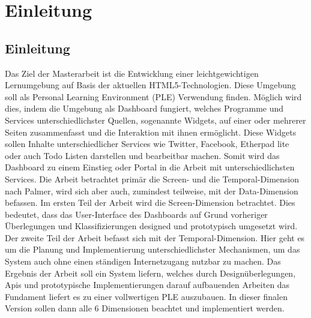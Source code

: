 \chapter{Einleitung} 
\label{Kapitel 1}
\section{Einleitung}
Das Ziel der Masterarbeit ist die Entwicklung einer leichtgewichtigen Lernumgebung auf Basis der aktuellen HTML5-Technologien. Diese Umgebung soll als Personal Learning Environment (PLE) Verwendung finden. Möglich wird dies, indem die Umgebung als Dashboard fungiert, welches Programme und Services unterschiedlichster Quellen, sogenannte Widgets, auf einer oder mehrerer Seiten zusammenfasst und die Interaktion mit ihnen ermöglicht. Diese Widgets sollen Inhalte unterschiedlicher Services wie Twitter, Facebook, Etherpad lite oder auch Todo Listen darstellen und bearbeitbar machen. Somit wird das Dashboard zu einem Einstieg oder Portal in die Arbeit mit unterschiedlichsten Services. 
Die Arbeit betrachtet primär die Screen- und die Temporal-Dimension nach Palmer, wird sich aber auch, zumindest teilweise, mit der Data-Dimension befassen. Im ersten Teil der Arbeit wird die Screen-Dimension betrachtet. Dies bedeutet, dass das User-Interface des Dashboards auf Grund vorheriger Überlegungen und Klassifizierungen designed und prototypisch umgesetzt wird. Der zweite Teil der Arbeit befasst sich mit der Temporal-Dimension. Hier geht es um die Planung und Implementierung unterschiedlichster Mechanismen, um das System auch ohne einen ständigen Internetzugang nutzbar zu machen.
Das Ergebnis der Arbeit soll ein System liefern, welches durch Designüberlegungen, Apis und prototypische Implementierungen darauf aufbauenden Arbeiten das Fundament liefert es zu einer vollwertigen PLE auszubauen. In dieser finalen Version sollen dann alle 6 Dimensionen beachtet und implementiert werden.